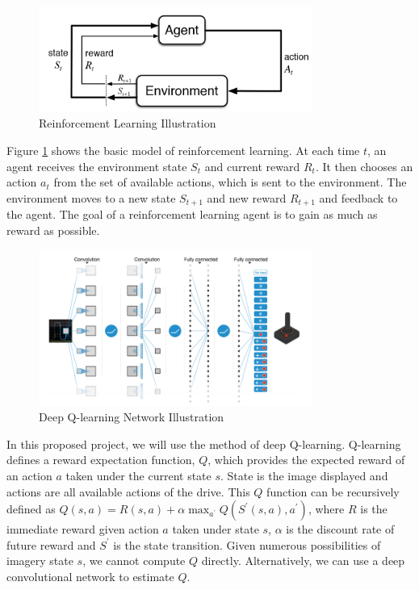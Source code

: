 \documentclass[a4paper]{article}
\begin{document}
\begin{figure}
    \centering
    \includegraphics[width=0.8\textwidth]{./figures/rl.png}
    \caption{ Reinforcement Learning Illustration}
    \label{fig:RL}
\end{figure}


Figure \ref{fig:RL} shows the basic model of reinforcement learning. At each time $t$, an agent
receives the environment state $S_t$ and current reward $R_t$. It then chooses an action $a_t$
from the set of available actions, which is sent to the environment. The environment moves
to a new state $S_{t+1}$ and new reward $R_{t+1}$ and feedback to the agent. The goal of a
reinforcement learning agent is to gain as much as reward as possible.


\begin{figure}
	\centering
	\includegraphics[width=0.8\textwidth]{./figures/deepq.png}
	\caption{ Deep Q-learning Network Illustration}
	\label{fig:deepq}
\end{figure}

In this proposed project, we will use the method of deep Q-learning. Q-learning defines a reward expectation function, $Q$, which provides the expected reward of an action $a$ taken under the current state $s$. State is the image displayed and actions are all available actions of the drive. This $Q$ function can be recursively defined as $Q(s,a) = R(s,a) + \alpha \max_{a^{'}} Q(S^{'}(s,a),a^{'})$, where $R$ is the immediate reward given action $a$ taken under state $s$, $\alpha$ is the discount rate of future reward and $S^{'}$ is the state transition. Given numerous possibilities of imagery state $s$, we cannot compute $Q$ directly. Alternatively, we can use a deep convolutional network to estimate $Q$.
\end{document}
